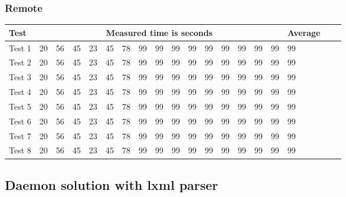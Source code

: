 \subsubsection{Remote}
\begin{center}
    \begin{tabular}{| l | l | l | l | l | l | l | l | l | l | l | l | l | l | l | l | l | l | l |}
    \hline
    Test & \multicolumn{15}{|c|}{Measured time is seconds} & Average \\ \hline
    Test 1 & 20 & 56 & 45 & 23 & 45 & 78 & 99 & 99 & 99 & 99 & 99 & 99 & 99 & 99 & 99 & 99 \\ \hline
    Test 2 & 20 & 56 & 45 & 23 & 45 & 78 & 99 & 99 & 99 & 99 & 99 & 99 & 99 & 99 & 99 & 99 \\ \hline
    Test 3 & 20 & 56 & 45 & 23 & 45 & 78 & 99 & 99 & 99 & 99 & 99 & 99 & 99 & 99 & 99 & 99 \\ \hline
    Test 4 & 20 & 56 & 45 & 23 & 45 & 78 & 99 & 99 & 99 & 99 & 99 & 99 & 99 & 99 & 99 & 99 \\ \hline
    Test 5 & 20 & 56 & 45 & 23 & 45 & 78 & 99 & 99 & 99 & 99 & 99 & 99 & 99 & 99 & 99 & 99 \\ \hline
    Test 6 & 20 & 56 & 45 & 23 & 45 & 78 & 99 & 99 & 99 & 99 & 99 & 99 & 99 & 99 & 99 & 99 \\ \hline
    Test 7 & 20 & 56 & 45 & 23 & 45 & 78 & 99 & 99 & 99 & 99 & 99 & 99 & 99 & 99 & 99 & 99 \\ \hline
    Test 8 & 20 & 56 & 45 & 23 & 45 & 78 & 99 & 99 & 99 & 99 & 99 & 99 & 99 & 99 & 99 & 99 \\ \hline
    \end{tabular}
\end{center}
\subsection{Daemon solution with  lxml parser}
